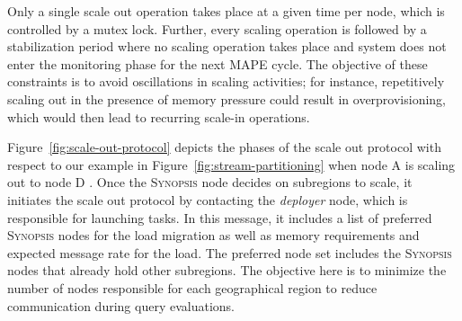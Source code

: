 Only a single scale out operation takes place at a given time per node, which is controlled by a mutex lock.
Further, every scaling operation is followed by a stabilization period where no scaling operation takes place and system does not enter the monitoring phase for the next MAPE cycle.
The objective of these constraints is to avoid oscillations in scaling activities; for instance, repetitively scaling out in the presence of memory pressure could result in overprovisioning, which would then lead to recurring scale-in operations.

Figure~\ref{fig:scale-out-protocol} depicts the phases of the scale out protocol with respect to our example in Figure~\ref{fig:stream-partitioning} when node A is scaling out to node D .
Once the \textsc{Synopsis} node decides on subregions to scale, it initiates the scale out protocol by contacting the \emph{deployer} node, which is responsible for launching tasks.
In this message, it includes a list of preferred \textsc{Synopsis} nodes for the load migration as well as memory requirements and expected message rate for the load.
The preferred node set includes the \textsc{Synopsis} nodes that already hold other subregions.
The objective here is to minimize the number of nodes responsible for each geographical region to reduce communication during query evaluations.

